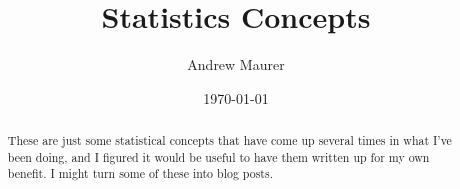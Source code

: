 \documentclass[12pt,draft,reqno]{amsart}
\begin{document}
\title{Statistics Concepts}
\author{Andrew Maurer}
\date{\today}

\begin{abstract}
  These are just some statistical concepts that have come up several times in what I've been doing, and I figured it would be useful to have them written up for my own benefit. I might turn some of these into blog posts.
\end{abstract}

\maketitle

\begin{center}
  \parbox{4.7in}{
    \tableofcontents
    }
\end{center}






\appendix

\vfill
\end{document}
